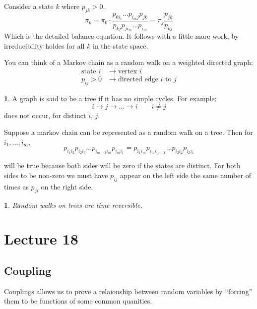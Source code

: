 \documentclass[english,12pt]{article}
\theoremstyle{plain}
\newtheorem*{proposition}{\protect\propositionname}
\theoremstyle{definition}
\newtheorem*{definition}{\protect\definitionname}
\theoremstyle{definition} %
\newcommand{\prop}[1]{\begin{proposition} #1 \end{proposition} }
\newcommand{\defn}[1]{\begin{definition} #1 \end{definition} }
\providecommand{\definitionname}{Definition}
\providecommand{\propositionname}{Proposition}
\begin{document}
Consider a state $k$ where $p_{jk}>0$.
\[\pi_k=\pi_0\cdot\frac{p_{0i_1}\ldots p_{i_mj}p_{jk}}{p_{kj}p_{ji_m}\ldots p_{i_10}}=\pi_j\frac{p_{jk}}{p_{kj}}\]
Which is the detailed balance equation.  It follows with a little more work, by irreducibility holdes for all $k$ in the state space.


You can think of a Markov chain as a random walk on a weighted directed graph:
\begin{align*}
\text{state }i&\rightarrow\text{vertex }i\\
p_{ij}>0&\rightarrow\text{directed edge }i\text{ to }j
\end{align*}

\defn{
A graph is said to be a tree if it has no simple cycles.  For example:
\[i\to j\to\ldots\to i\qquad i\ne j\]
does not occur, for distinct $i$, $j$.
}

Suppose a markov chain can be represented as a random walk on a tree.  Then for $i_1,\ldots,i_m$,
\[p_{i_1i_2}p_{i_2i_3}\ldots p_{i_{m-1}i_m}p_{i_mi_1}=p_{i_1i_m}p_{i_mi_{m-1}}\ldots p_{i_3i_2}p_{i_2i_1}\]

will be true because both sides will be zero if the states are distinct.  For both sides to be non-zero we must have $p_{ij}$ appear on the left side the same number of times as $p_{ji}$ on the right side.

\prop{
Random walks on trees are time reversible.
}

\section*{Lecture 18}
\subsection{Coupling}
Couplings allows us to prove a relaionship between random variables by ``forcing'' them to be functions of some common quanities.
\end{document}

